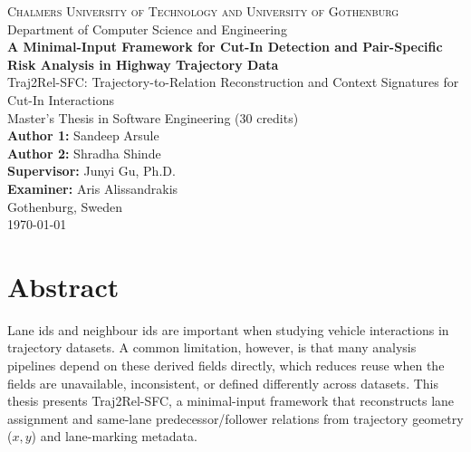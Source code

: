\documentclass[12pt,a4paper,twoside,openright]{report}
\newcommand{\ThesisTitle}{A Minimal-Input Framework for Cut-In Detection and Pair-Specific Risk Analysis in Highway Trajectory Data}
\newcommand{\FrameworkName}{Traj2Rel-SFC}
\newcommand{\ThesisSubtitle}{\FrameworkName: Trajectory-to-Relation Reconstruction and Context Signatures for Cut-In Interactions}
\newcommand{\AuthorOne}{Sandeep Arsule}
\newcommand{\AuthorTwo}{Shradha Shinde}
\newcommand{\SupervisorName}{Junyi Gu, Ph.D.}
\newcommand{\ExaminerName}{Aris Alissandrakis}
\newcommand{\UniversityName}{Chalmers University of Technology and University of Gothenburg}
\newcommand{\DepartmentName}{Department of Computer Science and Engineering}
\newcommand{\CityCountry}{Gothenburg, Sweden}
\newcommand{\ThesisDate}{\today}
\begin{document}

    \begin{titlepage}
        \thispagestyle{empty}
        \vspace*{2cm}

        \begin{center}
            {\Large \textsc{\UniversityName}}\\[0.5cm]
            {\large \DepartmentName}\\[2.0cm]

        {\huge \bfseries \ThesisTitle}\\[0.6cm]
        {\Large \ThesisSubtitle}\\[2.0cm]

        {\large Master's Thesis in Software Engineering (30 credits)}\\[1.2cm]

        {\large
        \textbf{Author 1:} \AuthorOne\\
        \textbf{Author 2:} \AuthorTwo
        }\\[1.2cm]

        {\large
        \textbf{Supervisor:} \SupervisorName\\
        \textbf{Examiner:} \ExaminerName
        }\\[1.6cm]

        {\large \CityCountry}\\
        {\large \ThesisDate}
        \end{center}

        \vfill
    \end{titlepage}

    \cleardoublepage
    \chapter*{Abstract}

    Lane ids and neighbour ids are important when studying vehicle interactions in trajectory datasets. A common limitation, however, is that many analysis pipelines depend on these derived fields directly, which reduces reuse when the fields are unavailable, inconsistent, or defined differently across datasets. This thesis presents \FrameworkName{}, a minimal-input framework that reconstructs lane assignment and same-lane predecessor/follower relations from trajectory geometry ($x,y$) and lane-marking metadata.
\end{document}
